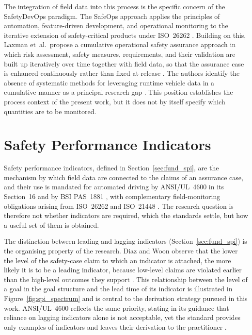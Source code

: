 The integration of field data into this process is the specific concern of the
SafetyDevOps paradigm. The SafeOps approach applies the principles of automation,
feature-driven development, and operational monitoring to the iterative extension of
safety-critical products under ISO~26262 \cite{munk2022safeops}. Building on this,
Laxman et~al.\ propose a cumulative operational safety assurance approach in which risk
assessment, safety measures, requirements, and their validation are built up
iteratively over time together with field data, so that the assurance case is
enhanced continuously rather than fixed at release \cite{laxman2024}. The authors
identify the absence of systematic methods for leveraging runtime vehicle data in a
cumulative manner as a principal research gap \cite{laxman2024}. This position
establishes the process context of the present work, but it does not by itself
specify which quantities are to be monitored.

\section{Safety Performance Indicators}
\label{sec:sota_spi}

Safety performance indicators, defined in Section~\ref{sec:fund_spi}, are the
mechanism by which field data are connected to the claims of an assurance case, and
their use is mandated for automated driving by ANSI/UL~4600 in its Section~16
\cite{ul4600} and by BSI PAS~1881 \cite{pas1881}, with complementary field-monitoring
obligations arising from ISO~26262 \cite{iso26262} and ISO~21448 \cite{iso21448}. The
research question is therefore not whether indicators are required, which the standards
settle, but how a useful set of them is obtained.

The distinction between leading and lagging indicators (Section~\ref{sec:fund_spi}) is
the organising property of the research. Diaz and Woon observe that the lower the level
of the safety-case claim to which an indicator is attached, the more likely it is to be
a leading indicator, because low-level claims are violated earlier than the high-level
outcomes they support \cite{diaz2022drspi}. This relationship between the level of a goal in the goal structure and the
lead time of its indicator is illustrated in Figure~\ref{fig:spi_spectrum} and is central to
the derivation strategy pursued in this work. ANSI/UL~4600 reflects the same priority,
stating in its guidance that reliance on lagging indicators alone is not acceptable,
yet the standard provides only examples of indicators and leaves their derivation to
the practitioner \cite{ul4600}.

